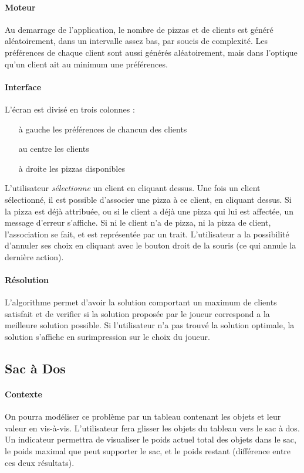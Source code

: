 		\paragraph{Moteur}
			Au demarrage de l'application, le nombre de pizzas et 
			 de clients est généré aléatoirement, dans un intervalle 
			 assez bas, par soucis de complexité.
			Les préférences de chaque client sont aussi générés aléatoirement,
			 mais dans l'optique qu'un client ait au minimum une préférences.
		\paragraph{Interface}
		    L'écran est divisé en trois colonnes :
		    \begin{itemize}
		        \item[à gauche] les préférences de chancun des clients
		        \item[au centre] les clients
		        \item[à droite] les pizzas disponibles
		    \end{itemize}

		L'utilisateur \emph{sélectionne} un client en cliquant dessus.
		    Une fois un client sélectionné, il est possible
		    d'associer une pizza à ce client, en cliquant dessus.
		    Si la pizza est déjà attribuée, ou si le client a déjà
		    une pizza qui lui est affectée, un message d'erreur s'affiche.
		    Si ni le client n'a de pizza, ni la pizza de client, l'association
		    se fait, et est représentée par un trait.
		L'utilisateur a la possibilité d'annuler ses choix en cliquant avec le bouton
		    droit de la souris (ce qui annule la dernière action).
		\paragraph{Résolution}
			L'algorithme permet d'avoir la solution comportant un maximum de clients
			 satisfait et de verifier si la solution proposée par le joueur correspond
			 a la meilleure solution possible.
 			Si l'utilisateur n'a pas trouvé la solution optimale, la solution s'affiche
			 en surimpression sur le choix du joueur.



    \subsection{Sac à Dos}
        \paragraph{Contexte}
        On pourra modéliser ce problème par un tableau contenant les objets et leur
        valeur en vis-à-vis. L'utilisateur fera glisser les objets du tableau vers
        le sac à dos. Un indicateur permettra de visualiser le poids actuel total
        des objets dans le sac, le poids maximal que peut supporter le sac, et le
        poids restant (différence entre ces deux résultats).

